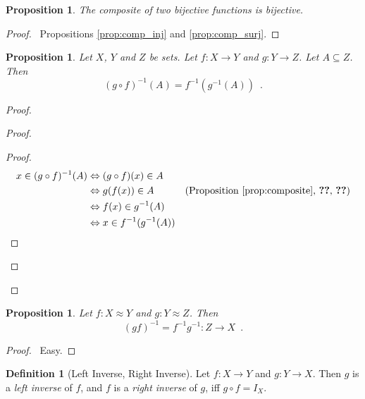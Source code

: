 \documentclass{report}
\let\qed\relax
\newtheorem{prop}[ax]{Proposition}
\theoremstyle{definition}
\newtheorem{df}[ax]{Definition}
\begin{document}
\begin{prop}
The composite of two bijective functions is bijective.
\end{prop}

\begin{proof}
\pf\ Propositions \ref{prop:comp_inj} and \ref{prop:comp_surj}. \qed
\end{proof}

\begin{prop}
Let $X$, $Y$ and $Z$ be sets. Let $f : X \rightarrow Y$ and $g : Y \rightarrow Z$. Let $A \subseteq Z$. Then
\[ (g \circ f)^{-1}(A) = f^{-1}(g^{-1}(A)) \enspace . \]
\end{prop}

\begin{proof}
\pf
{}
\begin{proof}
	\pf
	\begin{proof}
		\pf
		\begin{align*}
			x \in (g \circ f)^{-1}(A) & \Leftrightarrow (g \circ f)(x) \in A \\
			& \Leftrightarrow g(f(x)) \in A & (\text{Proposition \ref{prop:composite}, \stepref{2}, \stepref{a}}) \\
			& \Leftrightarrow f(x) \in g^{-1}(A) \\
			& \Leftrightarrow x \in f^{-1}(g^{-1}(A))
		\end{align*}
	\end{proof}
\end{proof}
\qed
\end{proof}

\begin{prop}
Let $f : X \approx Y$ and $g : Y \approx Z$. Then
\[ (gf)^{-1} = f^{-1}g^{-1} : Z \rightarrow X \enspace . \]
\end{prop}

\begin{proof}
\pf\ Easy. \qed
\end{proof}

\begin{df}[Left Inverse, Right Inverse]
Let $f : X \rightarrow Y$ and $g : Y \rightarrow X$. Then $g$ is a \emph{left inverse} of $f$, and $f$ is a \emph{right inverse} of $g$, iff $g \circ f = I_X$.
\end{df}
\end{document}
